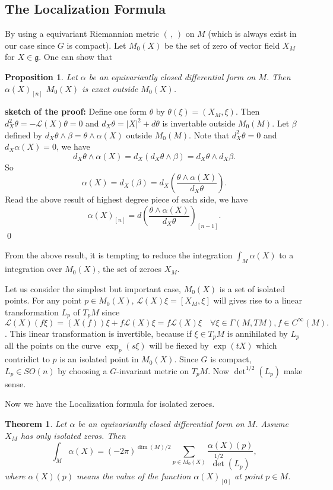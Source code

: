 \documentclass[11pt]{amsart}
\newtheorem{Thm}{Theorem}
\newtheorem{Prop}{Proposition}
\def\cL{{\mathcal{L}}}
\def\fgg{{\mathfrak{g}}}
\def\sproof{{\bf sketch of the proof:}}
\begin{document}
\subsection{The Localization Formula}
By using a equivariant Riemannian metric $(\,,\,)$ on $M$ (which is always exist
in our case since $G$ is compact). 
Let $M_0(X)$ be the set of zero of vector field $X_M$ for $X\in \fgg$.
One can show that 
\begin{Prop}
Let $\alpha$ be an equivariantly closed differential form on $M$. 
Then $\alpha(X)_{[n]}$ $M_0(X)$ is exact outside $M_0(X)$.
\end{Prop}
\sproof 
Define one form $\theta$ by $\theta(\xi) = (X_M, \xi)$. 
Then $d_X^2 \theta  = -\cL(X)\theta  = 0$ and $d_X\theta  = |X|^2 + d\theta$ is
invertable outside $M_0(M)$. 
Let $\beta$ defined by $ d_X\theta \wedge \beta = \theta \wedge \alpha(X)$ outside $M_0(M)$.
Note that $d_X^2 \theta=0$ and $d_X\alpha(X) = 0$, we have
\[
d_X\theta \wedge \alpha(X) = 
d_X(d_X\theta \wedge \beta) = d_X\theta \wedge d_X\beta.
\]
So 
\[
\alpha(X) = d_X(\beta) = d_X\left(\frac{\theta\wedge \alpha(X)}{d_X\theta}\right).
\]
Read the above result of highest degree piece of each side, we have
\[
\alpha(X)_{[n]} = d\left(\frac{\theta\wedge \alpha(X)}{d_X\theta}\right)_{[n-1]}.
\] \qed

From the above result, it is tempting to reduce the integration
$\int_M\alpha(X)$ to a integration over $M_0(X)$, the set of zeroes $X_M$.

Let us consider the simplest but important case, $M_0(X)$ is a set of
isolated points.
For any point $p\in M_0(X)$,
$\cL(X)\xi = [X_M,\xi]$ will gives rise to a linear
transformation $L_p$ of $T_pM$ since 
\[\cL(X)(f\xi) = (X(f))\xi + f\cL(X)\xi = f\cL(X)\xi \quad \forall \xi
\in \Gamma(M,TM), f\in C^\infty(M).
\]. This linear transformation is invertible, because if $\xi\in T_pM$ is
annihilated by $L_p$ all the  points on the curve $\exp_p(s\xi)$ will
be fiexed by $\exp(tX)$ which contridict to  $p$ is an isolated point
in $M_0(X)$.
Since $G$ is compact, $L_p\in SO(n)$ by choosing a $G$-invariant
metric on $T_pM$. Now $\det^{1/2} (L_p)$ make sense.

Now we have the Localization formula for isolated zeroes.
  
\begin{Thm}
Let $\alpha$ be an equivariantly closed differential form
  on $M$. Assume $X_M$ has only isolated zeros. Then
\begin{equation}
\label{eq:localization}
\int_M \alpha(X) = (-2\pi)^{\dim(M)/2}\sum_{p\in M_0(X)}\frac{\alpha(X)(p)}{\det^{1/2}(L_p)},
\end{equation}
where $\alpha(X)(p)$ means the value of the function $\alpha(X)_{[0]}$
at point $p\in M$.
\end{Thm}
\end{document}
